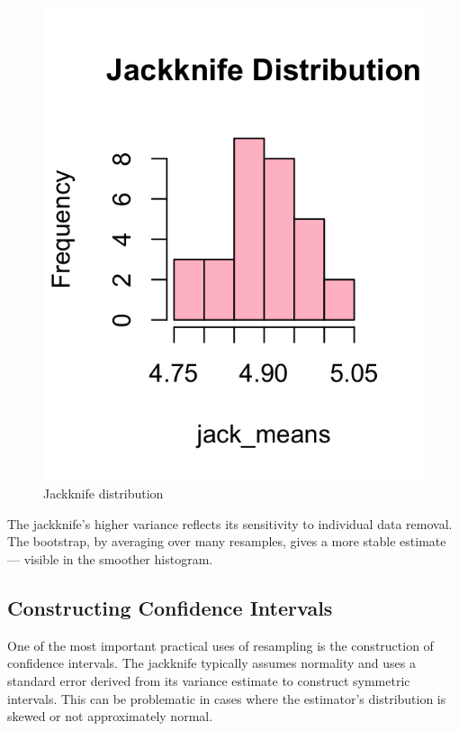 \documentclass{article}
\begin{document}
\begin{figure}[h!]
\begin{minipage}[b]{0.45\textwidth}
  \includegraphics[width=\textwidth]{Rplot03.png}
  \caption{Jackknife distribution}
  \label{fig:jackknife-dist}
\end{minipage}
\end{figure}

The jackknife's higher variance reflects its sensitivity to individual data removal. The bootstrap, by averaging over many resamples, gives a more stable estimate — visible in the smoother histogram. \\

\newpage

\subsection{Constructing Confidence Intervals}

One of the most important practical uses of resampling is the construction of confidence intervals. The jackknife typically assumes normality and uses a standard error derived from its variance estimate to construct symmetric intervals. This can be problematic in cases where the estimator's distribution is skewed or not approximately normal.
\end{document}
